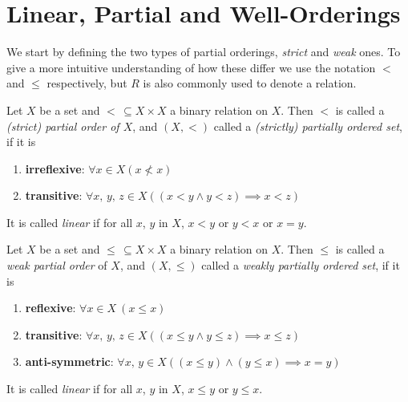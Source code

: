 \documentclass[../../main.tex]{subfiles}
\begin{document}
\section{Linear, Partial and Well-Orderings}

We start by defining the two types of partial orderings, \textit{strict} and \textit{weak} ones.
To give a more intuitive understanding of how these differ we use the notation $<$ and $\leq$ respectively, but $R$ is also commonly used to denote a relation.

\begin{definition}\cite[p.165]{Gol17}
    Let $X$ be a set and $<\, \subseteq X \times X$ a binary relation on $X$.
    Then $<$ is called a \textit{(strict) partial order of $X$}, and $(X, <)$ called a \textit{(strictly) partially ordered set}, if it is
    \begin{enumerate}[label=(\roman*)]
        \item \textbf{irreflexive}: $\forall x \in X \left(x \not < x\right)$
        \item \textbf{transitive}: $\forall x,\, y,\, z \in X \left(\left(x < y \wedge y < z\right) \implies x < z\right)$
    \end{enumerate}
    It is called \textit{linear} if for all $x$, $y$ in $X$, $x < y$ or $y < x$ or $x = y$.
\end{definition}

\begin{definition}\cite[p.164]{Gol17}
    Let $X$ be a set and $\leq\, \subseteq X \times X$ a binary relation on $X$.
    Then $\leq$ is called a \textit{weak partial order} of $X$, and $(X, \leq)$ called a \textit{weakly partially ordered set}, if it is
    \begin{enumerate}[label=(\roman*)]
        \item \textbf{reflexive}: $\forall x \in X \ (x \leq x)$
        \item \textbf{transitive}: $\forall x,\, y,\, z \in X \left(\left(x \leq y \wedge y \leq z\right) \implies x \leq z\right)$
        \item \textbf{anti-symmetric}: $\forall x,\, y \in X \left((x \leq y) \wedge (y \leq x) \implies x = y\right)$
    \end{enumerate} 
    It is called \textit{linear} if for all $x$, $y$ in $X$, $x \leq y$ or $y \leq x$.
\end{definition}
\end{document}
